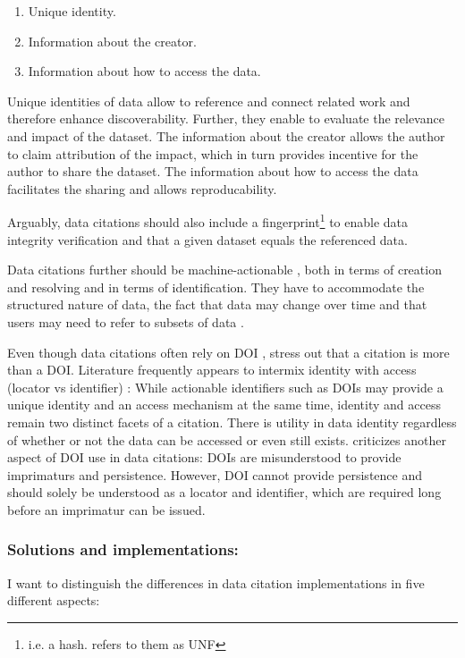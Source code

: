 \documentclass[letterpaper, parskip=half]{scrartcl}
\begin{document}
\begin{enumerate}
 \item Unique identity.
 \item Information about the creator.
 \item Information about how to access the data.
\end{enumerate}

Unique identities of data allow to reference and connect related work and therefore enhance discoverability. Further, they enable to evaluate the relevance and impact of the dataset. The information about the creator allows the author to claim attribution of the impact, which in turn provides incentive for the author to share the dataset. The information about how to access the data facilitates the sharing and allows reproducability.

Arguably, data citations should also include a fingerprint\footnote{i.e. a hash. \citep{Crosas2011} refers to them as \gls{UNF}} to enable data integrity verification \citep{Crosas2011} and that a given dataset equals the referenced data.

Data citations further should be machine-actionable \citep{Assante2016, Altman2015, Buneman2016}, both in terms of creation and resolving and in terms of identification.
They have to accommodate the structured nature of data, the fact that data may change over time and that users may need to refer to subsets of data \citep{Buneman2010}.

Even though data citations often rely on \gls{DOI} \citep{Castelli2013}, \cite{Buneman2010} stress out that a citation is more than a \gls{DOI}.
Literature frequently appears to intermix identity with access (locator vs identifier) \citep{ESIP2012a}: While actionable identifiers such as \glspl{DOI} may provide a unique identity and an access mechanism at the same time, identity and access remain two distinct facets of a citation. There is utility in data identity regardless of whether or not the data can be accessed or even still exists.
\Cite{Parsons2013a} criticizes another aspect of \gls{DOI} use in data citations: \Glspl{DOI} are misunderstood to provide imprimaturs and persistence. However, \gls{DOI} cannot provide persistence and should solely be understood as a locator and identifier, which are required long before an imprimatur can be issued.

\newpage
\subsubsection{Solutions and implementations:}
I want to distinguish the differences in data citation implementations in five different aspects:
\end{document}
